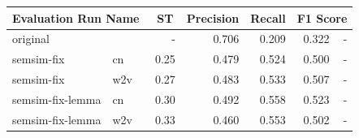 \documentclass[11pt]{scrreprt}
\begin{document}
\begin{table}
\centering
\begin{tabular}{lllrrrrr}
\toprule
\multicolumn{3}{l}{Evaluation Run Name}	& \multicolumn{1}{c}{ST} & \multicolumn{1}{c}{Precision} & \multicolumn{1}{c}{Recall} & \multicolumn{2}{c}{F1 Score}\\
\midrule
original &  &  & - & 0.706 & 0.209 & 0.322 & - \\
\hline
semsim-fix & cn &  & 0.25 & 0.479 & 0.524 & 0.500 & - \\
semsim-fix & w2v &  & 0.27 & 0.483 & 0.533 & 0.507 & - \\
semsim-fix-lemma & cn &  & 0.30 & 0.492 & 0.558 & 0.523 & - \\
semsim-fix-lemma & w2v &  & 0.33 & 0.460 & 0.553 & 0.502 & - \\
\hline



\end{tabular}
\end{table}
\end{document}
